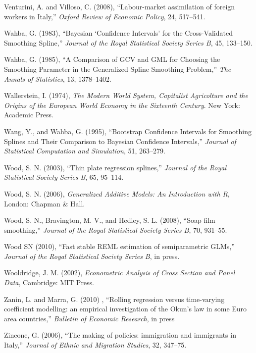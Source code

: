 \documentclass[10pt]{article}
\theoremstyle{definition}
\theoremstyle{plain}
\begin{document}
\begin{thebibliography}{99}
\bibitem{} Venturini, A. and Villoso, C. (2008), ``Labour-market assimilation of foreign workers in Italy,'' \textit{Oxford Review of Economic Policy}, 24, 517--541.

\bibitem{} Wahba, G. (1983), ``Bayesian `Confidence Intervals' for the Cross-Validated Smoothing Spline,'' \textit{Journal of the Royal Statistical Society Series B}, 45, 133--150.

\bibitem{} Wahba, G. (1985), ``A Comparison of GCV and GML for Choosing the Smoothing Parameter in the Generalized Spline Smoothing Problem,'' \textit{The Annals of Statistics}, 13, 1378--1402.

\bibitem{} Wallerstein, I. (1974), \textit{The Modern World System, Capitalist Agricolture and the Origins of the European World Economy in the Sixteenth Century}. New York: Academic Press.

\bibitem{} Wang, Y., and Wahba, G. (1995), ``Bootstrap Confidence Intervals for Smoothing Splines and Their Comparison to Bayesian Confidence Intervals,'' \textit{Journal of Statistical Computation and Simulation}, 51, 263--279.

\bibitem{} Wood, S. N. (2003), ``Thin plate regression splines,'' \textit{Journal of the Royal Statistical Society Series B}, 65, 95--114.

\bibitem{} Wood, S. N. (2006), \textit{Generalized Additive Models: An Introduction with R}, London: Chapman $\&$ Hall.

\bibitem{} Wood, S. N., Bravington, M. V., and Hedley, S. L. (2008), ``Soap film smoothing,'' \textit{Journal of the Royal Statistical Society Series B}, 70, 931--55.

\bibitem{} Wood SN (2010), ``Fast stable REML estimation of semiparametric GLMs,'' \textit{Journal of the Royal Statistical Society Series B}, in press.

\bibitem{} Wooldridge, J. M. (2002), \textit{Econometric Analysis of Cross Section and Panel Data}, Cambridge: MIT Press.

\bibitem{} Zanin, L. and Marra, G. (2010) , ``Rolling regression versus time-varying coefficient modelling: an empirical investigation of the Okun's law in some Euro area countries,'' \textit{Bulletin of Economic Research}, in press


\bibitem{} Zincone, G. (2006), ``The making of policies: immigration and immigrants in Italy,'' \textit{Journal of Ethnic and Migration Studies}, 32, 347--75.


\end{thebibliography}
\end{document}
